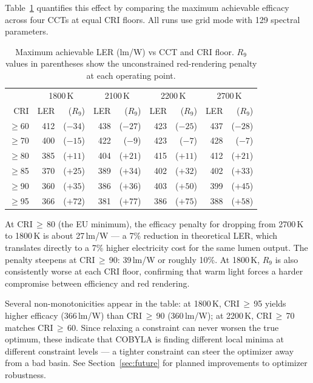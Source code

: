 \documentclass[11pt]{article}
\begin{document}
Table~\ref{tab:cct-comparison} quantifies this effect by comparing
the maximum achievable efficacy across four CCTs at equal CRI floors.
All runs use grid mode with 129 spectral parameters.

\begin{table}[H]
\centering
\caption{Maximum achievable LER (lm/W) vs CCT and CRI floor.
  $R_9$ values in parentheses show the unconstrained red-rendering
  penalty at each operating point.}
\label{tab:cct-comparison}
\begin{tabular}{r|rr|rr|rr|rr}
\toprule
 & \multicolumn{2}{c|}{1800\,K} & \multicolumn{2}{c|}{2100\,K}
 & \multicolumn{2}{c|}{2200\,K} & \multicolumn{2}{c}{2700\,K} \\
CRI & LER & ($R_9$) & LER & ($R_9$) & LER & ($R_9$) & LER & ($R_9$) \\
\midrule
$\geq$60 & 412 & ($-34$) & 438 & ($-27$) & 423 & ($-25$) & 437 & ($-28$) \\
$\geq$70 & 400 & ($-15$) & 422 & ($-9$)  & 423 & ($-7$)  & 428 & ($-7$)  \\
$\geq$80 & 385 & ($+11$) & 404 & ($+21$) & 415 & ($+11$) & 412 & ($+21$) \\
$\geq$85 & 370 & ($+25$) & 389 & ($+34$) & 402 & ($+32$) & 402 & ($+33$) \\
$\geq$90 & 360 & ($+35$) & 386 & ($+36$) & 403 & ($+50$) & 399 & ($+45$) \\
$\geq$95 & 366 & ($+72$) & 381 & ($+77$) & 386 & ($+75$) & 388 & ($+58$) \\
\bottomrule
\end{tabular}
\end{table}

\noindent At CRI\,$\geq$\,80 (the EU minimum), the efficacy penalty
for dropping from 2700\,K to 1800\,K is about 27\,lm/W --- a 7\%
reduction in theoretical LER, which translates directly to a 7\%
higher electricity cost for the same lumen output.  The penalty
steepens at CRI\,$\geq$\,90: 39\,lm/W or roughly 10\%.  At 1800\,K,
$R_9$ is also consistently worse at each CRI floor, confirming that
warm light forces a harder compromise between efficiency and red
rendering.

Several non-monotonicities appear in the table: at 1800\,K,
CRI\,$\geq$\,95 yields higher efficacy (366\,lm/W) than
CRI\,$\geq$\,90 (360\,lm/W); at 2200\,K, CRI\,$\geq$\,70 matches
CRI\,$\geq$\,60.  Since relaxing a constraint can never worsen the
true optimum, these indicate that COBYLA is finding different local
minima at different constraint levels --- a tighter constraint can
steer the optimizer away from a bad basin.  See
Section~\ref{sec:future} for planned improvements to optimizer
robustness.
\end{document}
